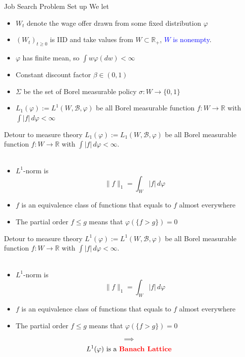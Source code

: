 \documentclass[aspectratio=169]{beamer} %
\begin{document}
\begin{frame}{Job Search Problem Set up}
    We let 
    \begin{itemize}
        \item $W_t$ denote the wage offer drawn from some fixed distribution $\varphi$
        \item $(W_t)_{t\ge 0}$ is IID and take values from $W\subset \mathbb{R}_+$, \textcolor{blue}{$W$ is nonempty}.
        \item $\varphi$ has finite mean, so $\int w\varphi(dw)<\infty$
        \item Constant discount factor $\beta\in(0,1)$
        \item $\Sigma$ be the set of Borel measurable policy $\sigma: W\to \{0,1\}$
         \item $L_1(\varphi):= L^1(W,\mathscr{B}, \varphi)$ be all Borel measurable function $f:W\to \mathbb{R}$ with $\int|f|\,d\varphi<\infty$
    \end{itemize}
\end{frame}
\begin{frame}{Detour to measure theory}
$L_1(\varphi):= L_1(W,\mathscr{B}, \varphi)$ be all Borel measurable function $f:W\to \mathbb{R}$ with $\int|f|\,d\varphi<\infty$.\\
\\
\begin{itemize}
    \item $L^1$-norm is
    $$
    \|f\|_1 = \int_W |f|\, d\varphi
    $$
    \item $f$ is an equivalence class of functions that equals to $f$ almost everywhere
    \item The partial order $f\le g$ means that $\varphi(\{f>g\})=0$
\end{itemize}
\end{frame}


\begin{frame}{Detour to measure theory}
$L^1(\varphi):= L^1(W,\mathscr{B}, \varphi)$ be all Borel measurable function $f:W\to \mathbb{R}$ with $\int|f|\,d\varphi<\infty$.\\
\\
\begin{itemize}
    \item $L^1$-norm is
    $$
    \|f\|_1 = \int_W |f|\, d\varphi
    $$
    \item $f$ is an equivalence class of functions that equals to $f$ almost everywhere
    \item The partial order $f\le g$ means that $\varphi(\{f>g\})=0$
\end{itemize}
$$
\implies
$$
$$
\text{$L^1(\varphi)$ is a \textcolor{red}{\textbf{Banach Lattice}}}
$$
\end{frame}
\end{document}

